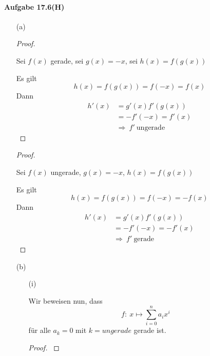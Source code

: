 \newpage

\paragraph{Aufgabe 17.6(H)}

\begin{enumerate}

\item[(a)]

\begin{proof}
$ $\newline

Sei $f(x)$ gerade, sei $g(x)=-x$, sei $h(x)=f(g(x))$

Es gilt
\begin{equation*}
h(x)=f(g(x))=f(-x)=f(x)
\end{equation*}
Dann
\begin{align*}
h'(x)&=g'(x)f'(g(x))\\
&=-f'(-x)=f'(x)\\
&\Rightarrow\ f'\ \mbox{ungerade}
\end{align*}
\end{proof}

\begin{proof}
$ $\newline

Sei $f(x)$ ungerade, $g(x)=-x$, $h(x)=f(g(x))$

Es gilt
\begin{equation*}
h(x)=f(g(x))=f(-x)=-f(x)
\end{equation*}
Dann
\begin{align*}
h'(x)&=g'(x)f'(g(x))\\
&=-f'(-x)=-f'(x)\\
&\Rightarrow\ f'\ \mbox{gerade}
\end{align*}
\end{proof}

\newpage

\item[(b)]

\begin{enumerate}

\item[(i)]

Wir beweisen nun, dass
\begin{equation*}
f:\ x\mapsto\sum_{i=0}^n a_ix^i
\end{equation*}
für alle $a_k=0$ mit $k=ungerade$ gerade ist.

\begin{proof}
$ $\newline


\end{proof}
\end{enumerate}
\end{enumerate}
